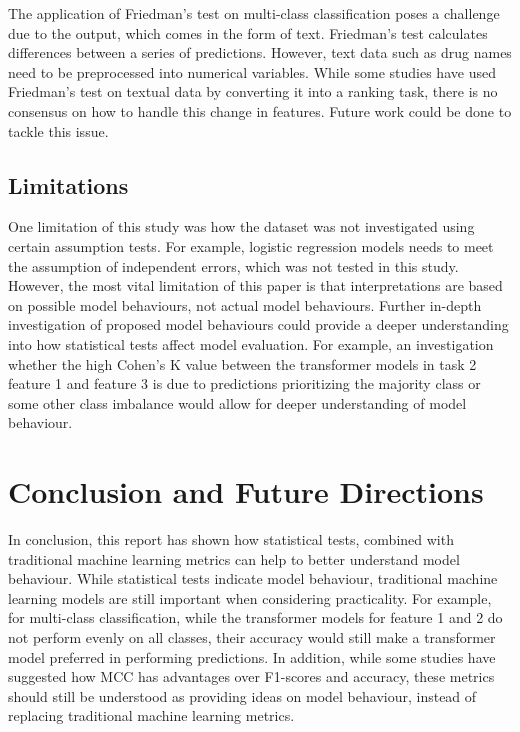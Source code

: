 \documentclass[10.7pt, onecolumn]{article}
\begin{document}
The application of Friedman's test on multi-class classification poses a challenge due to the output, which comes in the form of text. Friedman's test calculates differences between a series of predictions. However, text data such as drug names need to be preprocessed into numerical variables. While some studies have used Friedman's test on textual data by converting it into a ranking task\cite{article1}, there is no consensus on how to handle this change in features. Future work could be done to tackle this issue.

\subsection{Limitations}

One limitation of this study was how the dataset was not investigated using certain assumption tests. For example, logistic regression models needs to meet the assumption of independent errors, which was not tested in this study. However, the most vital limitation of this paper is that interpretations are based on possible model behaviours, not actual model behaviours. Further in-depth investigation of proposed model behaviours could provide a deeper understanding into how statistical tests affect model evaluation. For example, an investigation whether the high Cohen's K value between the transformer models in task 2 feature 1 and feature 3 is due to predictions prioritizing the majority class or some other class imbalance would allow for deeper understanding of model behaviour.

\section{Conclusion and Future Directions}

In conclusion, this report has shown how statistical tests, combined with traditional machine learning metrics can help to better understand model behaviour. While statistical tests indicate model behaviour, traditional machine learning models are still important when considering practicality. For example, for multi-class classification, while the transformer models for feature 1 and 2 do not perform evenly on all classes, their accuracy would still make a transformer model preferred in performing predictions. In addition, while some studies have suggested how MCC has advantages over F1-scores and accuracy\cite{articlesss}, these metrics should still be understood as providing ideas on model behaviour, instead of replacing traditional machine learning metrics.
\end{document}
